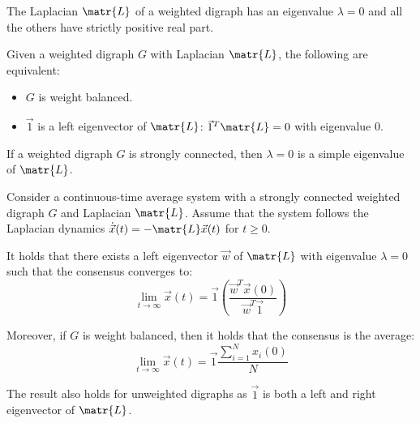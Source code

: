 \begin{lemma} \label{th:weighted_laplacian_eigenvalues}
    The Laplacian $\matr{L}$ of a weighted digraph has an eigenvalue $\lambda=0$ and all the others have strictly positive real part.
\end{lemma}

\begin{lemma}
    Given a weighted digraph $G$ with Laplacian $\matr{L}$, the following are equivalent:
    \begin{itemize}
        \item $G$ is weight balanced.
        \item $\vec{1}$ is a left eigenvector of $\matr{L}$: $\vec{1}^T\matr{L} = 0$ with eigenvalue $0$.
    \end{itemize}
\end{lemma}

\begin{lemma} \label{th:connected_simple_eigenvalue}
    If a weighted digraph $G$ is strongly connected, then $\lambda = 0$ is a simple eigenvalue of $\matr{L}$.
\end{lemma}

\begin{theorem} 
    Consider a continuous-time average system with a strongly connected weighted digraph $G$ and Laplacian $\matr{L}$. Assume that the system follows the Laplacian dynamics $\dot{\vec{x}}(t) = - \matr{L}\vec{x}(t)$ for $t \geq 0$. 
    
    It holds that there exists a left eigenvector $\vec{w}$ of $\matr{L}$ with eigenvalue $\lambda=0$ such that the consensus converges to:
    \[
        \lim_{t \rightarrow \infty} \vec{x}(t) = \vec{1} \left( \frac{\vec{w}^T \vec{x}(0)}{\vec{w}^T \vec{1}} \right)
    \]

    Moreover, if $G$ is weight balanced, then it holds that the consensus is the average:
    \[
        \lim_{t \rightarrow \infty} \vec{x}(t) = \vec{1} \frac{\sum_{i=1}^N x_i(0)}{N}
    \]

        
\end{theorem}

\begin{remark}
    The result also holds for unweighted digraphs as $\vec{1}$ is both a left and right eigenvector of $\matr{L}$.
\end{remark}





